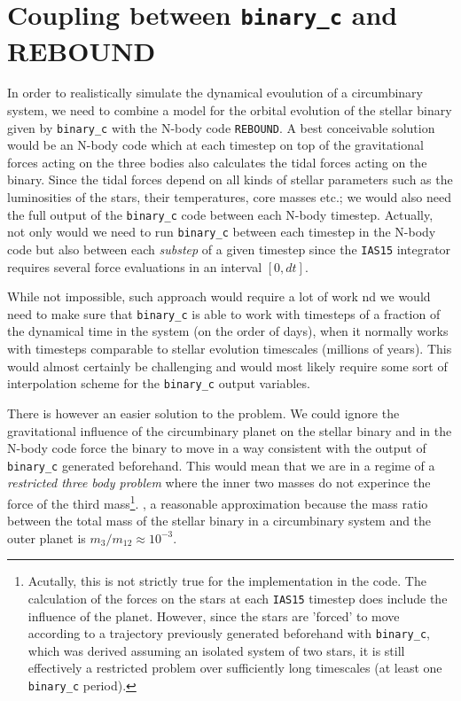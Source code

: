 \documentclass[ twoside,openright,titlepage,numbers=noenddot,headinclude,%
                footinclude=true,cleardoublepage=empty,abstractoff, %
                BCOR=5mm,paper=a4,fontsize=11pt,%
                american,%
                ]{scrreprt}
\begin{document}
\section{Coupling between \texttt{binary\_c} and REBOUND}
\label{sec:coupling_binary_c_rebound}
In order to realistically simulate the dynamical evoulution of a circumbinary
system, we need to combine a model for the orbital evolution of the stellar
binary given by \texttt{binary\_c} with the N-body code \texttt{REBOUND}. A best
conceivable solution would be an N-body code which at each timestep on top of
the gravitational forces acting on the three bodies also calculates the 
tidal forces acting on the binary. Since 
the tidal forces depend on all kinds of stellar parameters such as the
luminosities of the stars, their temperatures, core masses etc.; 
we would also need the full output of the \texttt{binary\_c} code between each 
N-body timestep. Actually, not only would we need to run \texttt{binary\_c} 
between each timestep in the N-body code but also between each \emph{substep}  
of a given timestep since the \texttt{IAS15} integrator requires several force
evaluations in an interval $[0,dt]$.

While not impossible, such approach would require a lot of work nd we
would need to make sure that \texttt{binary\_c} is able to work with timesteps
of a fraction of the dynamical time in the system (on the order of days), when
it normally works with timesteps comparable to stellar evolution timescales 
(millions of years). This would almost certainly be challenging and would most
likely
require some sort of interpolation scheme for the \texttt{binary\_c} output
variables.

There is  however an easier solution to the problem. We could ignore the gravitational
influence of the circumbinary planet on the stellar binary and in the N-body
code force the binary to move in a way consistent with the output of 
\texttt{binary\_c} generated beforehand. This would mean that we are in a regime
of a \emph{restricted three body problem} where the inner two masses do not 
experince the force of the third mass\footnote{Acutally, this is not strictly
true for the implementation in the code. The calculation of the forces on the 
stars at each \texttt{IAS15} timestep does include the influence of the planet.
However, since the stars are 'forced' to move according to a trajectory 
previously generated
beforehand with \texttt{binary\_c}, which was derived assuming an isolated system of 
two stars, it is still effectively a restricted problem over sufficiently long
timescales (at least one \texttt{binary\_c} period).}.
, a reasonable approximation because
the mass ratio between the total mass of the stellar binary in a circumbinary
system and the outer planet is $m_3/m_{12}\approx 10^{-3}$.
\end{document}
